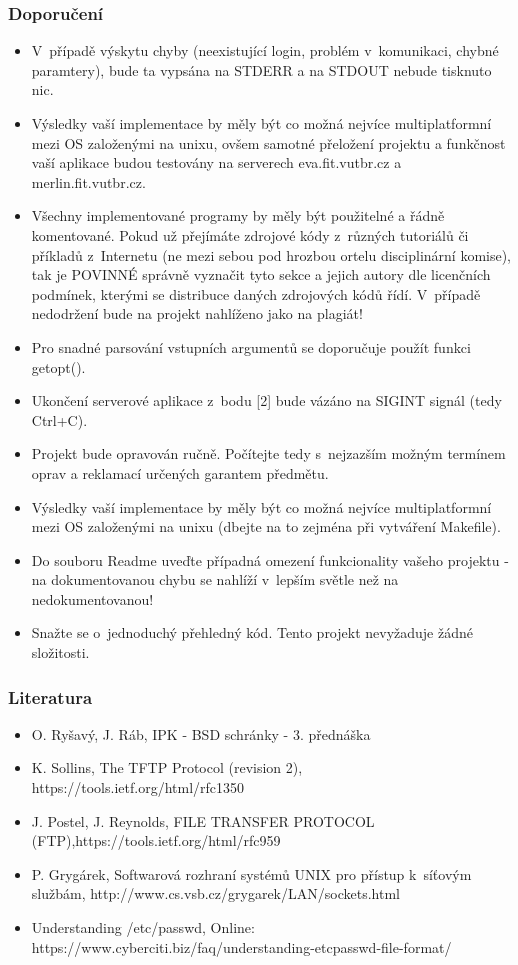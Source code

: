 \documentclass[11pt, a4paper, titlepage]{article}
\begin{document}
\subsubsection*{\textbf{Doporučení}}

\begin{itemize}
	\item V~případě výskytu chyby (neexistující login, problém v~komunikaci, chybné paramtery), bude ta vypsána na STDERR a na STDOUT nebude tisknuto nic.
	\item Výsledky vaší implementace by měly být co možná nejvíce multiplatformní mezi OS založenými na unixu, ovšem samotné přeložení projektu a funkčnost vaší aplikace budou testovány na serverech eva.fit.vutbr.cz a merlin.fit.vutbr.cz.
	\item Všechny implementované programy by měly být použitelné a řádně komentované. Pokud už přejímáte zdrojové kódy z~různých tutoriálů či příkladů z~Internetu (ne mezi sebou pod hrozbou ortelu disciplinární komise), tak je POVINNÉ správně vyznačit tyto sekce a jejich autory dle licenčních podmínek, kterými se distribuce daných zdrojových kódů řídí. V~případě nedodržení bude na projekt nahlíženo jako na plagiát!
	\item Pro snadné parsování vstupních argumentů se doporučuje použít funkci getopt().
	\item Ukončení serverové aplikace z~bodu [2] bude vázáno na SIGINT signál (tedy Ctrl+C).
	\item Projekt bude opravován ručně. Počítejte tedy s~nejzazším možným termínem oprav a reklamací určených garantem předmětu.
	\item Výsledky vaší implementace by měly být co možná nejvíce multiplatformní mezi OS založenými na unixu (dbejte na to zejména při vytváření Makefile).
	\item Do souboru Readme uveďte případná omezení funkcionality vašeho projektu - na dokumentovanou chybu se nahlíží v~lepším světle než na nedokumentovanou!
	\item Snažte se o~jednoduchý přehledný kód. Tento projekt nevyžaduje žádné složitosti.
\end{itemize}


\subsubsection*{\textbf{Literatura}}

\begin{itemize}
	\item O. Ryšavý, J. Ráb, IPK - BSD schránky - 3. přednáška
	\item K. Sollins, The TFTP Protocol (revision 2), https://tools.ietf.org/html/rfc1350
	\item J. Postel, J. Reynolds, FILE TRANSFER PROTOCOL (FTP),https://tools.ietf.org/html/rfc959
	\item P. Grygárek, Softwarová rozhraní systémů UNIX pro přístup k~síťovým službám, http://www.cs.vsb.cz/grygarek/LAN/sockets.html
	\item Understanding /etc/passwd, Online: https://www.cyberciti.biz/faq/understanding-etcpasswd-file-format/
\end{itemize}
\end{document}
